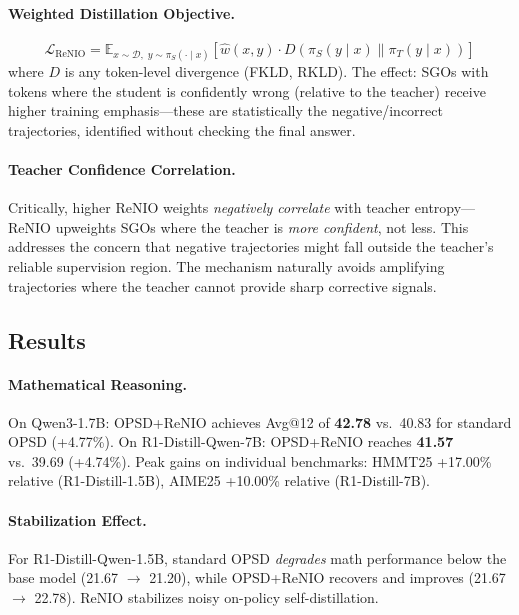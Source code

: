 \documentclass[11pt,a4paper]{article}
\begin{document}
\paragraph{Weighted Distillation Objective.}
\begin{equation}
\mathcal{L}_{\mathrm{ReNIO}} = \mathbb{E}_{x \sim \mathcal{D},\; y \sim \pi_S(\cdot \mid x)} \left[\hat{w}(x, y) \cdot D(\pi_S(y \mid x) \| \pi_T(y \mid x))\right]
\end{equation}
where $D$ is any token-level divergence (FKLD, RKLD). The effect: SGOs with tokens where the student is confidently wrong (relative to the teacher) receive higher training emphasis---these are statistically the negative/incorrect trajectories, identified without checking the final answer.

\paragraph{Teacher Confidence Correlation.} Critically, higher ReNIO weights \emph{negatively correlate} with teacher entropy---ReNIO upweights SGOs where the teacher is \emph{more confident}, not less. This addresses the concern that negative trajectories might fall outside the teacher's reliable supervision region. The mechanism naturally avoids amplifying trajectories where the teacher cannot provide sharp corrective signals.

\subsection{Results}

\paragraph{Mathematical Reasoning.} On Qwen3-1.7B: OPSD+ReNIO achieves Avg@12 of \textbf{42.78} vs.\ 40.83 for standard OPSD (+4.77\%). On R1-Distill-Qwen-7B: OPSD+ReNIO reaches \textbf{41.57} vs.\ 39.69 (+4.74\%). Peak gains on individual benchmarks: HMMT25 +17.00\% relative (R1-Distill-1.5B), AIME25 +10.00\% relative (R1-Distill-7B).

\paragraph{Stabilization Effect.} For R1-Distill-Qwen-1.5B, standard OPSD \emph{degrades} math performance below the base model (21.67 $\to$ 21.20), while OPSD+ReNIO recovers and improves (21.67 $\to$ 22.78). ReNIO stabilizes noisy on-policy self-distillation.
\end{document}

